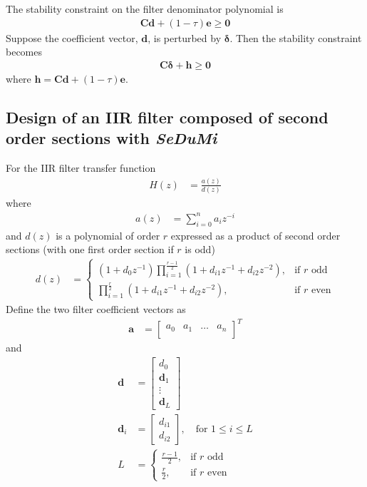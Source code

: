\documentclass[a4paper,twoside,10pt,english]{report}
\begin{document}
The stability constraint on the filter denominator polynomial is 
\begin{align*}
\boldsymbol{C}\boldsymbol{d}+\left(1-\tau\right)\boldsymbol{e} \ge \boldsymbol{0}
\end{align*}
Suppose the coefficient vector, $\boldsymbol{d}$, is perturbed by 
$\boldsymbol{\delta}$. Then the stability constraint becomes
\begin{align*}
\boldsymbol{C}\boldsymbol{\delta}+\boldsymbol{h} \ge \boldsymbol{0}
\end{align*}
where $\boldsymbol{h}=\boldsymbol{C}\boldsymbol{d}+
\left(1-\tau\right)\boldsymbol{e}$.
\subsection{\label{sec:Design-IIR-filter-2nd-order-sections-with-SeDuMi}Design of an IIR filter composed of second order sections with \emph{SeDuMi}}
For the IIR filter transfer function
\begin{align*}
H\left(z\right) &= \frac{a\left(z\right)}{d\left(z\right)}
\end{align*}
where
\begin{align*}
a\left(z\right) &= \sum^{n}_{i=0}a_{i}z^{-i}
\end{align*}
and $d\left(z\right)$ is a polynomial of order $r$ expressed as a product of 
second order sections (with one first order section if $r$ is odd)
\begin{align*}
d\left(z\right) &= \begin{cases}
\left(1+d_{0}z^{-1}\right)
\prod^{\frac{r-1}{2}}_{i=1}\left(1+d_{i1}z^{-1}+d_{i2}z^{-2}\right),
&\text{if $r$ odd}\\
\prod^{\frac{r}{2}}_{i=1}\left(1+d_{i1}z^{-1}+d_{i2}z^{-2}\right),&\text{if $r$ even}
\end{cases}
\end{align*}
Define the two filter coefficient vectors as
\begin{align*}
\boldsymbol{a}&=\left[\begin{array}{cccc}
a_{0} & a_{1} & \hdots & a_{n}\\
\end{array}\right]^{T}
\end{align*}
and
\begin{align*}
\boldsymbol{d}&=\left[\begin{array}{c}
d_{0}\\
\boldsymbol{d}_{1}\\
\vdots\\
\boldsymbol{d}_{L}
\end{array}\right]\\
\boldsymbol{d}_{i}&=\left[\begin{array}{c}
d_{i1}\\
d_{i2}
\end{array}\right],\quad\text{for } 1\le i\le L\\
L&=\begin{cases}
\frac{r-1}{2},&\text{if $r$ odd}\\
\frac{r}{2},&\text{if $r$ even}
\end{cases}
\end{align*}
\end{document}
